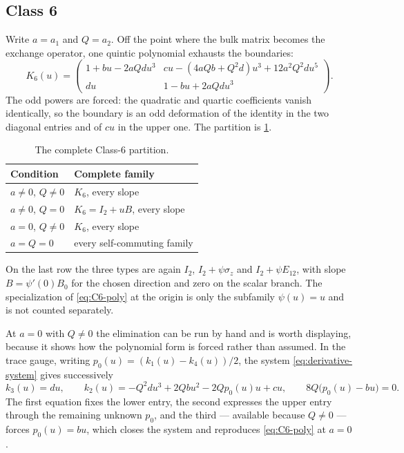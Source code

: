 \documentclass[11pt,reqno]{amsart}
\theoremstyle{plain}
\theoremstyle{definition}
\theoremstyle{remark}
\numberwithin{equation}{section}
\newcommand{\Id}{I_2}
\begin{document}
\subsection{Class 6}
\label{subsec:c6}

Write $a=a_1$ and $Q=a_2$. Off the point where the bulk matrix becomes the
exchange operator, one quintic polynomial exhausts the boundaries:
\begin{equation}
K_6(u)=\begin{pmatrix}
1+bu-2aQdu^3&
cu-(4aQb+Q^2d)u^3+12a^2Q^2du^5\\
du&1-bu+2aQdu^3
\end{pmatrix}.                                      \label{eq:C6-poly}
\end{equation}
The odd powers are forced: the quadratic and quartic coefficients vanish
identically, so the boundary is an odd deformation of the identity in the two
diagonal entries and of $cu$ in the upper one. The partition is
\cref{tab:C6-cells}.

\begin{table}[t]
\centering\small
\caption{The complete Class-6 partition.}
\label{tab:C6-cells}
\begin{tabularx}{\textwidth}{>{\RaggedRight\arraybackslash}X >{\RaggedRight\arraybackslash}X}
\toprule
Condition & Complete family \\
\midrule
$a\ne0$, $Q\ne0$ & $K_6$, every slope \\
$a\ne0$, $Q=0$ & $K_6=\Id+uB$, every slope \\
$a=0$, $Q\ne0$ & $K_6$, every slope \\
$a=Q=0$ & every self-commuting family \\
\bottomrule
\end{tabularx}
\end{table}

On the last row the three types are again $\Id$, $\Id+\psi\sigma_z$ and
$\Id+\psi E_{12}$, with slope $B=\psi'(0)B_0$ for the chosen direction and zero
on the scalar branch. The specialization of \cref{eq:C6-poly} at the origin is
only the subfamily $\psi(u)=u$ and is not counted separately.

At $a=0$ with $Q\ne0$ the elimination can be run by hand and is worth displaying,
because it shows how the polynomial form is forced rather than assumed. In the
trace gauge, writing $p_0(u)=(k_1(u)-k_4(u))/2$, the system
\cref{eq:derivative-system} gives successively
\begin{equation}
k_3(u)=du,\qquad
k_2(u)=-Q^2du^3+2Qbu^2-2Qp_0(u)u+cu,\qquad
8Q\bigl(p_0(u)-bu\bigr)=0.
\label{eq:C6-elimination}
\end{equation}
The first equation fixes the lower entry, the second expresses the upper entry
through the remaining unknown $p_0$, and the third --- available because $Q\ne0$
--- forces $p_0(u)=bu$, which closes the system and reproduces
\cref{eq:C6-poly} at $a=0$.
\end{document}
